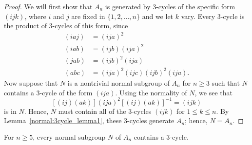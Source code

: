  
\begin{proof}
We will first show that $A_n$ is generated by 3-cycles of the specific
form $(ijk)$, where $i$ and $j$ are fixed in  $\{ 1, 2, \ldots, n \}$
and we let $k$ vary. Every 3-cycle is the product of 3-cycles of this 
form, since
\begin{align*}
(i a j) & = (i j a)^2  \\
(i a b) & = (i j b) (i j a)^2 \\
(j a b) & = (i j b)^2 (i j a) \\
(a b c) & = (i j a)^2 (i j c) (i j b)^2 (i j a).
\end{align*}
Now suppose that $N$ is a nontrivial normal subgroup of $A_n$ for $n 
\geq 3$  such that $N$ contains a 3-cycle of the form $(i j a)$. Using
the normality of $N$, we see that
\[
[(i j)(a k)](i j a)^2 [(i j)(a k)]^{-1} = (i j k)
\]
is in $N$. Hence, $N$ must contain all of the 3-cycles $(i j k)$ 
for $1 \leq k \leq n$. By Lemma~\ref{normal:3cycle_lemma1}, these 3-cycles generate $A_n$; 
hence, $N = A_n$. 
\end{proof}
 
 
\begin{lemma}\label{normal:3cycle_lemma3}
For $n \geq 5$, every normal subgroup $N$ of $A_n$ contains a
$3$-cycle. 
\end{lemma}
 
